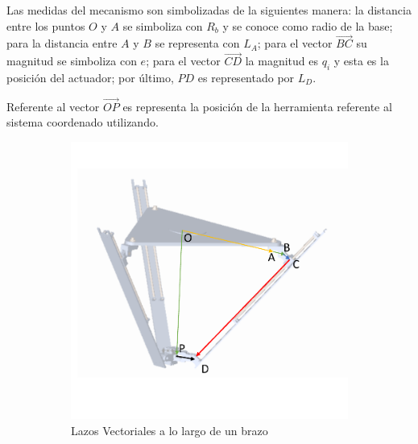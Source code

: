 Las medidas del mecanismo son simbolizadas de la siguientes manera: la distancia entre los puntos $O$ y $A$ se simboliza con $R_{b}$ y se conoce como radio de la base; para la distancia entre $A$ y $B$ se representa con $L_A$; para el vector $\vec{BC}$ su magnitud se simboliza con $e$; para el vector $\vec{CD}$ la magnitud es $q_i$ y esta es la posición del actuador; por último, $PD$ es representado por $L_D$.

Referente al vector $\vec{OP}$ es representa la posición de la herramienta referente al sistema coordenado utilizando.

\begin{figure}[htb!]
    \centering
    \begin{subfigure}{0.6\textwidth}
        \includegraphics[width=0.9\linewidth]{Cap4_DisenoBasico/Figura/PDFLAZOS1.pdf}
        \caption{Lazos Vectoriales a lo largo de un brazo}
        \label{fig:LazosVectorialesArm}
    \end{subfigure}
    \begin{subfigure}{0.45\textwidth}

\end{subfigure}
\end{figure}
